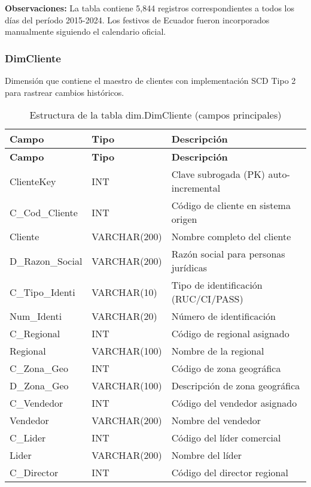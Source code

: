 \textbf{Observaciones:} La tabla contiene 5,844 registros correspondientes a todos los días del período 2015-2024. Los festivos de Ecuador fueron incorporados manualmente siguiendo el calendario oficial.

\subsubsection{DimCliente}

Dimensión que contiene el maestro de clientes con implementación SCD Tipo 2 para rastrear cambios históricos.

\begin{longtable}{|p{4cm}|p{3cm}|p{8cm}|}
\caption{Estructura de la tabla dim.DimCliente (campos principales)} \\
\hline
\textbf{Campo} & \textbf{Tipo} & \textbf{Descripción} \\
\hline
\endfirsthead
\hline
\textbf{Campo} & \textbf{Tipo} & \textbf{Descripción} \\
\hline
\endhead
ClienteKey & INT & Clave subrogada (PK) auto-incremental \\
\hline
C\_Cod\_Cliente & INT & Código de cliente en sistema origen \\
\hline
Cliente & VARCHAR(200) & Nombre completo del cliente \\
\hline
D\_Razon\_Social & VARCHAR(200) & Razón social para personas jurídicas \\
\hline
C\_Tipo\_Identi & VARCHAR(10) & Tipo de identificación (RUC/CI/PASS) \\
\hline
Num\_Identi & VARCHAR(20) & Número de identificación \\
\hline
C\_Regional & INT & Código de regional asignado \\
\hline
Regional & VARCHAR(100) & Nombre de la regional \\
\hline
C\_Zona\_Geo & INT & Código de zona geográfica \\
\hline
D\_Zona\_Geo & VARCHAR(100) & Descripción de zona geográfica \\
\hline
C\_Vendedor & INT & Código del vendedor asignado \\
\hline
Vendedor & VARCHAR(200) & Nombre del vendedor \\
\hline
C\_Lider & INT & Código del líder comercial \\
\hline
Lider & VARCHAR(200) & Nombre del líder \\
\hline
C\_Director & INT & Código del director regional \\

\end{longtable}
